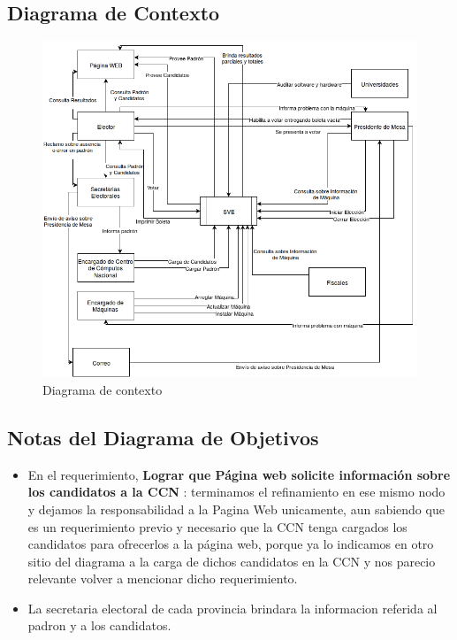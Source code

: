 \documentclass[spanish, 10pt,a4paper]{article}
\numberwithin{equation}{section} %
\begin{document}
\subsection{Diagrama de Contexto}

\begin{figure}[H]
  \centering
  \includegraphics[scale=0.50]{pdf/DiagramaDeContexto}
  \caption{Diagrama de contexto}
  \label{fig:DiagramaDeContexto}
\end{figure}

\clearpage


\newpage
\subsection{Notas del Diagrama de Objetivos}
\begin{itemize}
	\item En el requerimiento, \textbf{Lograr que Página web solicite información sobre los candidatos a la CCN} : terminamos el refinamiento en ese mismo nodo y dejamos la responsabilidad a la Pagina Web unicamente, aun sabiendo que es un requerimiento previo y necesario que la CCN tenga cargados los candidatos para ofrecerlos a la página web, porque ya lo indicamos en otro sitio del diagrama a la carga de dichos candidatos en la CCN y nos parecio relevante volver a mencionar dicho requerimiento.
\item  La secretaria electoral de cada provincia brindara la informacion referida al padron y a los candidatos.
\end{itemize}
\end{document}
